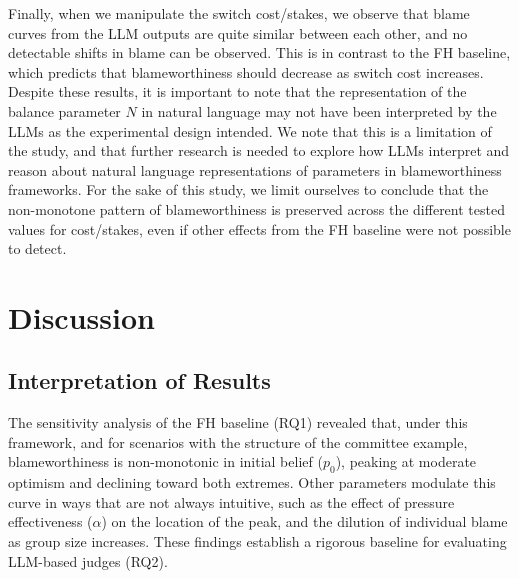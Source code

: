 \documentclass{article}
\begin{document}
Finally, when we manipulate the switch cost/stakes, we observe that blame curves from the LLM outputs are quite similar between each other, and no detectable shifts in blame can be observed. This is in contrast to the FH baseline, which predicts that blameworthiness should decrease as switch cost increases. Despite these results, it is important to note that the representation of the balance parameter $N$ in natural language may not have been interpreted by the LLMs as the experimental design intended. We note that this is a limitation of the study, and that further research is needed to explore how LLMs interpret and reason about natural language representations of parameters in blameworthiness frameworks. For the sake of this study, we limit ourselves to conclude that the non-monotone pattern of blameworthiness is preserved across the different tested values for cost/stakes, even if other effects from the FH baseline were not possible to detect.

\section{Discussion}\label{sec:discussion}

\subsection{Interpretation of Results}


The sensitivity analysis of the FH baseline (RQ1) revealed that, under this framework, and for scenarios with the structure of the committee example, blameworthiness is non-monotonic in initial belief ($p_0$), peaking at moderate optimism and declining toward both extremes. Other parameters modulate this curve in ways that are not always intuitive, such as the effect of pressure effectiveness ($\alpha$) on the location of the peak, and the dilution of individual blame as group size increases. These findings establish a rigorous baseline for evaluating LLM-based judges (RQ2).
\end{document}
